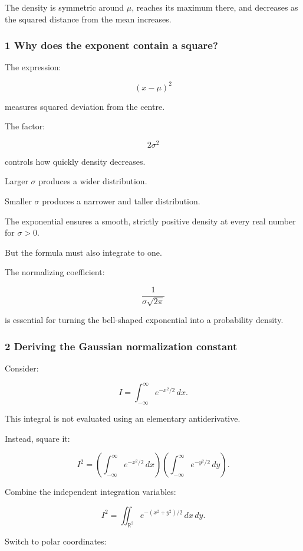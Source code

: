 The density is symmetric around \(\mu\), reaches its maximum there, and decreases as the squared distance from the mean increases.

\subsubsection{1 Why does the exponent contain a square?}\label{02-foundations-ii-ch023-why-does-the-exponent-contain-a-square}

The expression:

\[
 (x-\mu)^2
\]

measures squared deviation from the centre.

The factor:

\[
 2\sigma^2
\]

controls how quickly density decreases.

Larger \(\sigma\) produces a wider distribution.

Smaller \(\sigma\) produces a narrower and taller distribution.

The exponential ensures a smooth, strictly positive density at every real number for \(\sigma>0\).

But the formula must also integrate to one.

The normalizing coefficient:

\[
 \frac1{\sigma\sqrt{2\pi}}
\]

is essential for turning the bell-shaped exponential into a probability density.

\subsubsection{2 Deriving the Gaussian normalization constant}\label{02-foundations-ii-ch023-deriving-the-gaussian-normalization-constant}

Consider:

\[
 I=\int_{-\infty}^{\infty}e^{-x^2/2}\,dx.
\]

This integral is not evaluated using an elementary antiderivative.

Instead, square it:

\[
 I^2= \left(\int_{-\infty}^{\infty}e^{-x^2/2}\,dx\right) \left(\int_{-\infty}^{\infty}e^{-y^2/2}\,dy\right).
\]

Combine the independent integration variables:

\[
 I^2= \iint_{\mathbb R^2} e^{-(x^2+y^2)/2}\,dx\,dy.
\]

Switch to polar coordinates:

